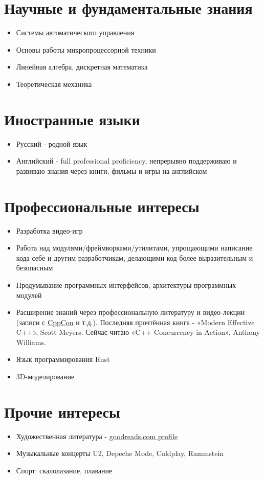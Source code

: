 \documentclass[a4paper, 11pt]{article}
\begin{document}
\section{Научные и фундаментальные знания}
\begin{itemize}
    \item Системы автоматического управления
    \item Основы работы микропроцессорной техники
    \item Линейная алгебра, дискретная математика
    \item Теоретическая механика
\end{itemize}

\section{Иностранные языки}
\begin{itemize}
    \item   Русский    - родной язык
    \item   Английский - full professional proficiency, непрерывно поддерживаю и
            развиваю знания через книги, фильмы и игры на английском
\end{itemize}

\section{Профессиональные интересы}
\begin{itemize}
    \item   Разработка видео-игр
    \item   Работа над модулями/фреймворками/утилитами, упрощающими написание
            кода себе и другим разработчикам, делающими код более выразительным
            и безопасным
    \item   Продумывание программных интерфейсов, архитектуры программных модулей
    \item   Расширение знаний через профессиональную литературу и видео-лекции
            (записи с \href{http://cppcon.org/}{CppCon} и т.д.). Последняя
            прочтённая книга - «Modern Effective C++», Scott Meyers. Сейчас
            читаю «C++ Concurrency in Action», Anthony Williams.
    \item   Язык программирования Rust
    \item   3D-моделирование
\end{itemize}

\section{Прочие интересы}
\begin{itemize}
    \item   Художественная литература -
            \href{https://www.goodreads.com/user/show/29629010-sergey-nikitin}{goodreads.com profile}
    \item   Музыкальные концерты U2, Depeche Mode, Coldplay, Rammstein
    \item   Спорт: скалолазание, плавание
\end{itemize}
\end{document}

